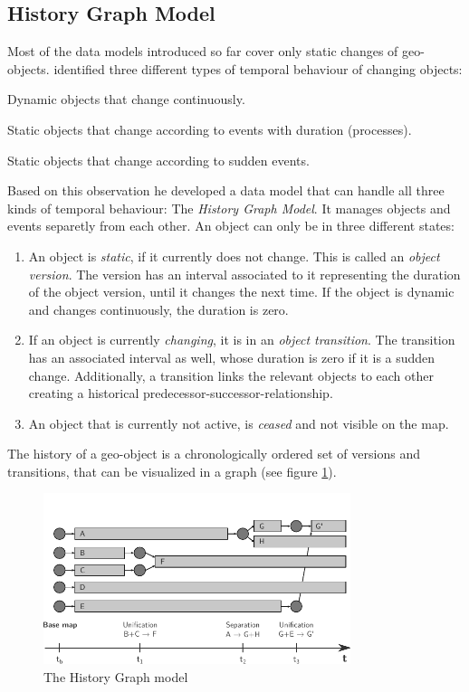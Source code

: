 \subsection{History Graph Model} %
\label{sub:history_graph_model}

Most of the data models introduced so far cover only static changes of geo-objects. \cite{key} identified three different types of temporal behaviour of changing objects:
\begin{compactitem}
  \item Dynamic objects that change continuously.
  \item Static objects that change according to events with duration (processes).
  \item Static objects that change according to sudden events.
\end{compactitem}

Based on this observation he developed a data model that can handle all three kinds of temporal behaviour: The \emph{History Graph Model}. It manages objects and events separetly from each other. An object can only be in three different states:
\begin{enumerate}
  \item An object is \emph{static}, if it currently does not change. This is called an \emph{object version}. The version has an interval associated to it representing the duration of the object version, until it changes the next time. If the object is dynamic and changes continuously, the duration is zero.
  \item If an object is currently \emph{changing}, it is in an \emph{object transition}. The transition has an associated interval as well, whose duration is zero if it is a sudden change. Additionally, a transition links the relevant objects to each other creating a historical predecessor-successor-relationship.
  \item An object that is currently not active, is \emph{ceased} and not visible on the map.
\end{enumerate}

The history of a geo-object is a chronologically ordered set of versions and transitions, that can be visualized in a graph (see figure \ref{fig:history_graph_model}).

\begin{figure}[H]
  \centering
  \includegraphics[width=0.8\textwidth]{graphics/basics/stdm/history_graph_model}
  \caption{The History Graph model}
  \label{fig:history_graph_model}
\end{figure}


